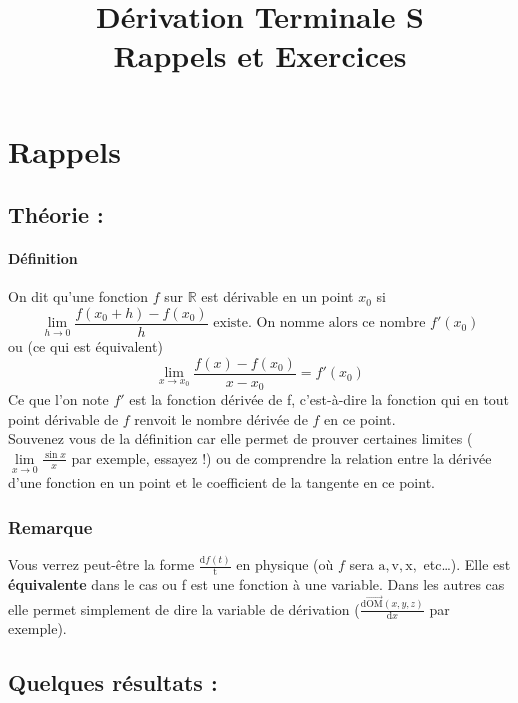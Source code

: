 \documentclass[11pt]{article}
\title{Dérivation Terminale S\\
        \large Rappels et Exercices}
\date{}
\author{}
\newcommand{\R}{\mathbb R}
\begin{document}
    
    \maketitle
    
    \section{Rappels}
        \subsection{Théorie :}
        
        \paragraph{Définition}
        On dit qu'une fonction $f$ sur $\R$ est dérivable en un point $x_0$ si
        \begin{equation}
            \lim\limits_{h \to 0} \frac{f(x_0 + h)-f(x_0)}{h} \text{ existe. On nomme alors ce nombre $f'(x_0)$} 
        \end{equation}
        ou (ce qui est équivalent)
        \begin{equation*}
            \lim\limits_{x \to x_0} \frac{f(x)-f(x_0)}{x-x_0} = f'(x_0)            
        \end{equation*}
        Ce que l'on note $f'$ est la fonction dérivée de f, c'est-à-dire la fonction qui en tout point dérivable de $f$ renvoit le nombre dérivée de $f$ en ce point.\\
        Souvenez vous de la définition car elle permet de prouver certaines limites ($\lim\limits_{x \to 0} \frac{\sin{x}}{x}$ par exemple, essayez !) ou de comprendre la relation entre la dérivée d'une fonction en un point et le coefficient de la tangente en ce point.
        \subsubsection*{Remarque}
        Vous verrez peut-être la forme $\frac{\mathrm{d}f(t)}{\mathrm{t}}$ en physique (où $f$ sera $\mathrm{a}, \mathrm{v}, \mathrm{x},$ etc\dots). Elle est \textbf{équivalente} dans le cas ou f est une fonction à une variable. Dans les autres cas elle permet simplement de dire la variable de dérivation ($\frac{\mathrm{d}\overrightarrow{\mathrm{OM}}(x,y,z)}{\mathrm{d}x}$ par exemple). 

        \subsection{Quelques résultats :}
\end{document}
